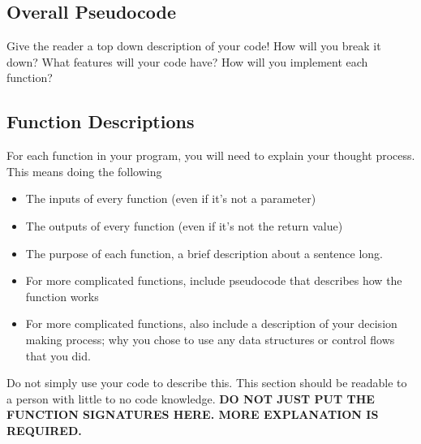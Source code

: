 \documentclass{article}
\begin{document}
\subsection{Overall Pseudocode}
Give the reader a top down description of your code! How will you break it down? What features will your code have? 
How will you implement each function?

\subsection{Function Descriptions}
For each function in your program, you will need to explain your thought process. This means doing the following
\begin{itemize}
    \item The inputs of every function (even if it's not a parameter)
    \item The outputs of every function (even if it's not the return value)
    \item The purpose of each function, a brief description about a sentence long. 
    \item For more complicated functions, include pseudocode that describes how the function works
    \item For more complicated functions, also include a description of your decision making process; why you chose to use any data structures or control flows that you did.
\end{itemize}
Do not simply use your code to describe this. This section should be readable to a person with little to no code knowledge. 
\textbf{DO NOT JUST PUT THE FUNCTION SIGNATURES HERE. MORE EXPLANATION IS REQUIRED.}




\end{document}
